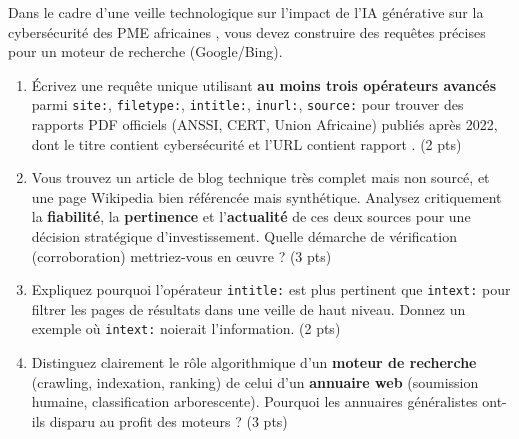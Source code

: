 \documentclass[11pt]{article}
\begin{document}
\begin{exercice}
Dans le cadre d'une veille technologique sur \og{} l'impact de l'IA générative sur la cybersécurité des PME africaines \fg{}, vous devez construire des requêtes précises pour un moteur de recherche (Google/Bing).
\begin{enumerate}
    \item Écrivez une requête unique utilisant \textbf{au moins trois opérateurs avancés} parmi \texttt{site:}, \texttt{filetype:}, \texttt{intitle:}, \texttt{inurl:}, \texttt{source:} pour trouver des rapports PDF officiels (ANSSI, CERT, Union Africaine) publiés après 2022, dont le titre contient \og{} cybersécurité \fg{} et l'URL contient \og{} rapport \fg{}. (2 pts)
    \item Vous trouvez un article de blog technique très complet mais non sourcé, et une page Wikipedia bien référencée mais synthétique. Analysez critiquement la \textbf{fiabilité}, la \textbf{pertinence} et l'\textbf{actualité} de ces deux sources pour une décision stratégique d'investissement. Quelle démarche de vérification (corroboration) mettriez-vous en œuvre ? (3 pts)
    \item Expliquez pourquoi l'opérateur \texttt{intitle:} est plus pertinent que \texttt{intext:} pour filtrer les pages de résultats dans une veille de haut niveau. Donnez un exemple où \texttt{intext:} noierait l'information. (2 pts)
    \item Distinguez clairement le rôle algorithmique d'un \textbf{moteur de recherche} (crawling, indexation, ranking) de celui d'un \textbf{annuaire web} (soumission humaine, classification arborescente). Pourquoi les annuaires généralistes ont-ils disparu au profit des moteurs ? (3 pts)
\end{enumerate}
\end{exercice}
\end{document}
